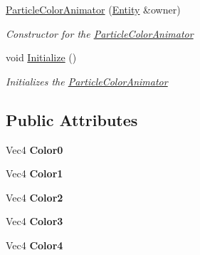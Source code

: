 \begin{DoxyCompactItemize}
\item 
\hyperlink{classDCEngine_1_1Components_1_1ParticleColorAnimator_aa0388ad0d34bf348ea4407ea6cbf3b01}{Particle\-Color\-Animator} (\hyperlink{classDCEngine_1_1Entity}{Entity} \&owner)
\begin{DoxyCompactList}\small\item\em Constructor for the \hyperlink{classDCEngine_1_1Components_1_1ParticleColorAnimator}{Particle\-Color\-Animator}  \end{DoxyCompactList}\item 
void \hyperlink{classDCEngine_1_1Components_1_1ParticleColorAnimator_aefb24b938c4978c84edc7ac50259f8e1}{Initialize} ()
\begin{DoxyCompactList}\small\item\em Initializes the \hyperlink{classDCEngine_1_1Components_1_1ParticleColorAnimator}{Particle\-Color\-Animator}  \end{DoxyCompactList}\end{DoxyCompactItemize}
\subsection*{Public Attributes}
\begin{DoxyCompactItemize}
\item 
\hypertarget{classDCEngine_1_1Components_1_1ParticleColorAnimator_a1ee357f8915e52a2c9c06c30129a9080}{Vec4 {\bfseries Color0}}\label{classDCEngine_1_1Components_1_1ParticleColorAnimator_a1ee357f8915e52a2c9c06c30129a9080}

\item 
\hypertarget{classDCEngine_1_1Components_1_1ParticleColorAnimator_aa784083db94b93819137ffa2eb17e551}{Vec4 {\bfseries Color1}}\label{classDCEngine_1_1Components_1_1ParticleColorAnimator_aa784083db94b93819137ffa2eb17e551}

\item 
\hypertarget{classDCEngine_1_1Components_1_1ParticleColorAnimator_acfb3d36b9a6c9e9b5f313269f3921737}{Vec4 {\bfseries Color2}}\label{classDCEngine_1_1Components_1_1ParticleColorAnimator_acfb3d36b9a6c9e9b5f313269f3921737}

\item 
\hypertarget{classDCEngine_1_1Components_1_1ParticleColorAnimator_a4021848b317153861ded1583d4b107e2}{Vec4 {\bfseries Color3}}\label{classDCEngine_1_1Components_1_1ParticleColorAnimator_a4021848b317153861ded1583d4b107e2}

\item 
\hypertarget{classDCEngine_1_1Components_1_1ParticleColorAnimator_a003ad43fa611477a0a672503e2a32faa}{Vec4 {\bfseries Color4}}\label{classDCEngine_1_1Components_1_1ParticleColorAnimator_a003ad43fa611477a0a672503e2a32faa}

\end{DoxyCompactItemize}
